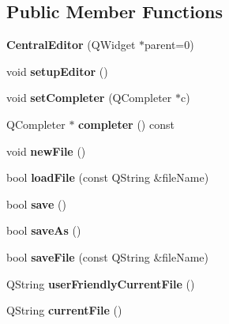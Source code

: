 \subsection*{Public Member Functions}
\begin{DoxyCompactItemize}
\item 
\hypertarget{class_central_editor_a24dbe7c90be370dd0d9e5e63a3f938cd}{
{\bfseries CentralEditor} (QWidget $\ast$parent=0)}
\label{class_central_editor_a24dbe7c90be370dd0d9e5e63a3f938cd}

\item 
\hypertarget{class_central_editor_ade611e7c61f4d2f2b4ae1f8582cd34f5}{
void {\bfseries setupEditor} ()}
\label{class_central_editor_ade611e7c61f4d2f2b4ae1f8582cd34f5}

\item 
\hypertarget{class_central_editor_af743f77d05cfc9b4ef0d9746c2bb45d2}{
void {\bfseries setCompleter} (QCompleter $\ast$c)}
\label{class_central_editor_af743f77d05cfc9b4ef0d9746c2bb45d2}

\item 
\hypertarget{class_central_editor_a85a6b62e38a4aff17c117132017bfebc}{
QCompleter $\ast$ {\bfseries completer} () const }
\label{class_central_editor_a85a6b62e38a4aff17c117132017bfebc}

\item 
\hypertarget{class_central_editor_aaea8d992e7528efb8e2efa9d8f36a20c}{
void {\bfseries newFile} ()}
\label{class_central_editor_aaea8d992e7528efb8e2efa9d8f36a20c}

\item 
\hypertarget{class_central_editor_a7068aaa139474e2d8ab923385239035e}{
bool {\bfseries loadFile} (const QString \&fileName)}
\label{class_central_editor_a7068aaa139474e2d8ab923385239035e}

\item 
\hypertarget{class_central_editor_a5aabb726159fb08e7808b8759820b250}{
bool {\bfseries save} ()}
\label{class_central_editor_a5aabb726159fb08e7808b8759820b250}

\item 
\hypertarget{class_central_editor_a7ec4b01c9793cf365d7ba2e226bd0205}{
bool {\bfseries saveAs} ()}
\label{class_central_editor_a7ec4b01c9793cf365d7ba2e226bd0205}

\item 
\hypertarget{class_central_editor_ab1ba928a7f12680af7a4f4161a694659}{
bool {\bfseries saveFile} (const QString \&fileName)}
\label{class_central_editor_ab1ba928a7f12680af7a4f4161a694659}

\item 
\hypertarget{class_central_editor_a135552311f98cb06b169a117470adf48}{
QString {\bfseries userFriendlyCurrentFile} ()}
\label{class_central_editor_a135552311f98cb06b169a117470adf48}

\item 
\hypertarget{class_central_editor_a04eee15f13e7a7f9a831d9b4a8077a3f}{
QString {\bfseries currentFile} ()}
\label{class_central_editor_a04eee15f13e7a7f9a831d9b4a8077a3f}

\end{DoxyCompactItemize}
